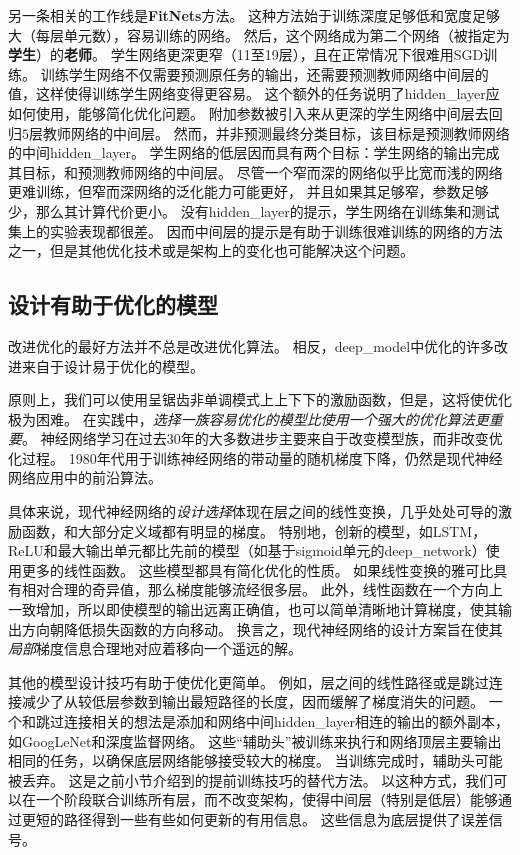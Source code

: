 另一条相关的工作线是\textbf{FitNets}\citep{Romero-et-al-ICLR2015-small}方法。
这种方法始于训练深度足够低和宽度足够大（每层单元数），容易训练的网络。
然后，这个网络成为第二个网络（被指定为\textbf{学生}）的\textbf{老师}。
学生网络更深更窄（11至19层），且在正常情况下很难用SGD训练。
训练学生网络不仅需要预测原任务的输出，还需要预测教师网络中间层的值，这样使得训练学生网络变得更容易。
这个额外的任务说明了\gls{hidden_layer}应如何使用，能够简化优化问题。
附加参数被引入来从更深的学生网络中间层去回归$5$层教师网络的中间层。
然而，并非预测最终分类目标，该目标是预测教师网络的中间\gls{hidden_layer}。
学生网络的低层因而具有两个目标：学生网络的输出完成其目标，和预测教师网络的中间层。
尽管一个窄而深的网络似乎比宽而浅的网络更难训练，但窄而深网络的泛化能力可能更好，
并且如果其足够窄，参数足够少，那么其计算代价更小。
没有\gls{hidden_layer}的提示，学生网络在训练集和测试集上的实验表现都很差。
因而中间层的提示是有助于训练很难训练的网络的方法之一，但是其他优化技术或是架构上的变化也可能解决这个问题。


\subsection{设计有助于优化的模型}
\label{sec:designing_models_to_aid_optimization}
改进优化的最好方法并不总是改进优化算法。
相反，\gls{deep_model}中优化的许多改进来自于设计易于优化的模型。

原则上，我们可以使用呈锯齿非单调模式上上下下的激励函数，但是，这将使优化极为困难。
在实践中，\emph{选择一族容易优化的模型比使用一个强大的优化算法更重要}。
神经网络学习在过去30年的大多数进步主要来自于改变模型族，而非改变优化过程。
1980年代用于训练神经网络的带动量的随机梯度下降，仍然是现代神经网络应用中的前沿算法。

具体来说，现代神经网络的\emph{设计选择}体现在层之间的线性变换，几乎处处可导的激励函数，和大部分定义域都有明显的梯度。
特别地，创新的模型，如LSTM，\gls{ReLU}和最大输出单元都比先前的模型（如基于sigmoid单元的\gls{deep_network}）使用更多的线性函数。
这些模型都具有简化优化的性质。
如果线性变换的雅可比具有相对合理的奇异值，那么梯度能够流经很多层。
此外，线性函数在一个方向上一致增加，所以即使模型的输出远离正确值，也可以简单清晰地计算梯度，使其输出方向朝降低损失函数的方向移动。
换言之，现代神经网络的设计方案旨在使其\emph{局部}梯度信息合理地对应着移向一个遥远的解。

其他的模型设计技巧有助于使优化更简单。
例如，层之间的线性路径或是跳过连接减少了从较低层参数到输出最短路径的长度，因而缓解了梯度消失的问题\citep{Srivastava-et-al-arxiv2015}。
一个和跳过连接相关的想法是添加和网络中间\gls{hidden_layer}相连的输出的额外副本，如GoogLeNet\citep{Szegedy-et-al-arxiv2014}和深度监督网络\citep{Lee-et-al-2014}。
这些``辅助头''被训练来执行和网络顶层主要输出相同的任务，以确保底层网络能够接受较大的梯度。
当训练完成时，辅助头可能被丢弃。
这是之前小节介绍到的提前训练技巧的替代方法。
以这种方式，我们可以在一个阶段联合训练所有层，而不改变架构，使得中间层（特别是低层）能够通过更短的路径得到一些有些如何更新的有用信息。
这些信息为底层提供了误差信号。

